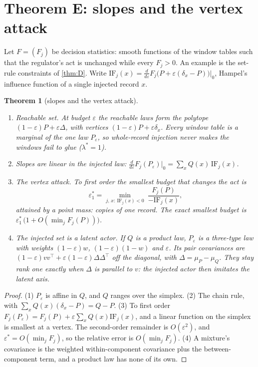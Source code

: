 \documentclass[11pt]{article}
\newtheorem{theorem}{Theorem}\renewcommand{\thetheorem}{\Alph{theorem}}
\theoremstyle{definition}\newtheorem{definition}{Definition}\newtheorem{remark}{Remark}
\begin{document}
\section{Theorem E: slopes and the vertex attack}\label{sec:E}
Let $F=(F_j)$ be decision statistics: smooth functions of the window tables such that the regulator's act is unchanged while every
$F_j>0$. An example is the set-rule constraints of \cref{thm:D}. Write $\mathrm{IF}_j(x)=\frac{d}{d\varepsilon}F_j\bigl(P+\varepsilon(\delta_x-P)\bigr)|_0$,
Hampel's influence function \cite{Hampel1974} of a single injected record $x$.

\begin{theorem}[slopes and the vertex attack]\label{thm:E}
\begin{enumerate}
\item[(1)] \emph{Reachable set.} At budget $\varepsilon$ the reachable laws form the polytope $(1-\varepsilon)P+\varepsilon\Delta$, with
vertices $(1-\varepsilon)P+\varepsilon\delta_x$. Every window table is a marginal of the one law $P_\varepsilon$, so whole-record
injection never makes the windows fail to glue ($\lambda^*=1$).
\item[(2)] \emph{Slopes are linear in the injected law:} $\frac{d}{d\varepsilon}F_j(P_\varepsilon)|_0=\sum_xQ(x)\,\mathrm{IF}_j(x)$.
\item[(3)] \emph{The vertex attack.} To first order the smallest budget that changes the act is
\[
\varepsilon^*_1=\min_{j,\,x:\ \mathrm{IF}_j(x)<0}\ \frac{F_j(P)}{-\mathrm{IF}_j(x)},
\]
attained by a point mass: copies of one record. The exact smallest budget is
$\varepsilon^*_1\,\bigl(1+O(\min_jF_j(P))\bigr)$.
\item[(4)] \emph{The injected set is a latent actor.} If $Q$ is a product law, $P_\varepsilon$ is a three-type law with weights
$(1-\varepsilon)w$, $(1-\varepsilon)(1-w)$ and $\varepsilon$. Its pair covariances are $(1-\varepsilon)vv^\top+\varepsilon(1-\varepsilon)\Delta\Delta^\top$
off the diagonal, with $\Delta=\mu_P-\mu_Q$. They stay rank one exactly when $\Delta$ is parallel to $v$: the injected actor then
imitates the latent axis.
\end{enumerate}
\end{theorem}

\begin{proof}
(1) $P_\varepsilon$ is affine in $Q$, and $Q$ ranges over the simplex. (2) The chain rule, with $\sum_xQ(x)(\delta_x-P)=Q-P$.
(3) To first order $F_j(P_\varepsilon)=F_j(P)+\varepsilon\sum_xQ(x)\mathrm{IF}_j(x)$, and a linear function on the simplex is smallest
at a vertex. The second-order remainder is $O(\varepsilon^2)$, and $\varepsilon^*=O(\min_jF_j)$, so the relative error is
$O(\min_jF_j)$. (4) A mixture's covariance is the weighted within-component covariance plus the between-component term, and a product
law has none of its own.
\end{proof}
\end{document}
